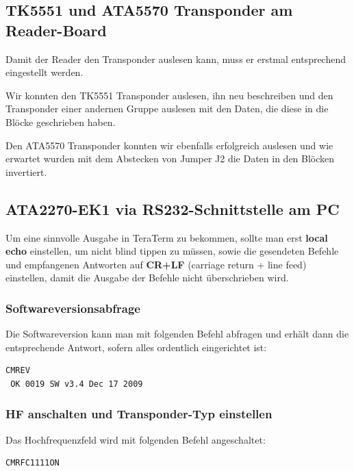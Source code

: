 \documentclass[paper=a4,fontsize=11pt,headsepline,footsepline,parskip=half]{scrartcl}
\begin{document}
\subsection{TK5551 und ATA5570 Transponder am Reader-Board}

Damit der Reader den Transponder auslesen kann, muss er erstmal entsprechend eingestellt werden.

Wir konnten den TK5551 Transponder auslesen, ihn neu beschreiben und den Transponder einer andernen Gruppe auslesen mit den Daten, die
diese in die Blöcke geschrieben haben.

Den ATA5570 Transponder konnten wir ebenfalls erfolgreich auslesen und wie erwartet wurden mit dem Abstecken von Jumper J2 die Daten in den Blöcken invertiert.

\subsection{ATA2270-EK1 via RS232-Schnittstelle am PC}

Um eine sinnvolle Ausgabe in TeraTerm zu bekommen, sollte man erst \textbf{local echo} einstellen, um nicht blind tippen zu müssen,
sowie die gesendeten Befehle und empfangenen Antworten auf \textbf{CR+LF} (carriage return + line feed) einstellen, damit die Ausgabe der
Befehle nicht überschrieben wird.

\subsubsection{Softwareversionsabfrage}

Die Softwareversion kann man mit folgenden Befehl abfragen und erhält dann die entsprechende Antwort, sofern alles ordentlich eingerichtet ist:

\begin{lstlisting}[caption={Softwareversionsabfrage.}]
 CMREV
 OK 0019 SW v3.4 Dec 17 2009
\end{lstlisting}

\subsubsection{HF anschalten und Transponder-Typ einstellen}

Das Hochfrequenzfeld wird mit folgenden Befehl angeschaltet:

\begin{lstlisting}[caption={HF anschalten.}]
 CMRFC1111ON
\end{lstlisting}
\end{document}
